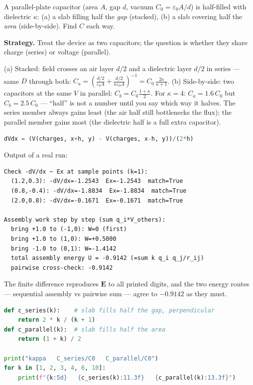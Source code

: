 \begin{example}\label{ex:halfdiel}
A parallel-plate capacitor (area $A$, gap $d$, vacuum $C_0=\varepsilon_0A/d$)
is half-filled with dielectric $\kappa$: (a) a slab filling half the
\emph{gap} (stacked), (b) a slab covering half the \emph{area}
(side-by-side). Find $C$ each way.
\par\smallskip
\textbf{Strategy.} Treat the device as two capacitors; the question is
whether they share charge (series) or voltage (parallel).
\begin{solution}
(a) Stacked: field crosses an air layer $d/2$ and a dielectric layer
$d/2$ in series --- same $D$ through both:
$C_a=\left(\frac{d/2}{\varepsilon_0A}+\frac{d/2}{\kappa\varepsilon_0A}\right)^{-1}
=C_0\,\frac{2\kappa}{\kappa+1}$.
(b) Side-by-side: two capacitors at the same $V$ in parallel:
$C_b=C_0\frac{1+\kappa}{2}$.
For $\kappa=4$: $C_a=1.6\,C_0$ but $C_b=2.5\,C_0$ --- ``half'' is
not a number until you say which way it halves. The series member
always gains least (the air half still bottlenecks the flux); the
parallel member gains most (the dielectric half is a full extra
capacitor). \checkmark
\end{solution}
\end{example}

\begin{lstlisting}[language=Python,caption={\texttt{code/ch11\_potential\_map.py} --- gradient check and assembly-energy audit.},label={lst:pot}]
dVdx = (V(charges, x+h, y) - V(charges, x-h, y))/(2*h)
\end{lstlisting}

Output of a real run:
\begin{lstlisting}[numbers=none]
Check -dV/dx ~ Ex at sample points (k=1):
  (1.2,0.3): -dV/dx=-1.2543  Ex=-1.2543  match=True
  (0.8,-0.4): -dV/dx=-1.8834  Ex=-1.8834  match=True
  (2.0,0.8): -dV/dx=-0.1671  Ex=-0.1671  match=True

Assembly work step by step (sum q_i*V_others):
  bring +1.0 to (-1,0): W=0 (first)
  bring +1.0 to (1,0): W=+0.5000
  bring -1.0 to (0,1): W=-1.4142
  total assembly energy U = -0.9142 (=sum k q_i q_j/r_ij)
  pairwise cross-check: -0.9142
\end{lstlisting}

The finite difference reproduces $\mathbf E$ to all printed digits, and
the two energy routes --- sequential assembly vs pairwise sum --- agree
to $-0.9142$ as they must.

\begin{lstlisting}[language=Python,caption={\texttt{code/ch11\_dielectric\_scan.py} --- half-dielectric both ways: how the gap is filled decides.},label={lst:dielscan}]
def c_series(k):    # slab fills half the gap, perpendicular
    return 2 * k / (k + 1)
def c_parallel(k):  # slab fills half the area
    return (1 + k) / 2

print("kappa   C_series/C0   C_parallel/C0")
for k in [1, 2, 3, 4, 6, 10]:
    print(f"{k:5d}   {c_series(k):11.3f}   {c_parallel(k):13.3f}")
\end{lstlisting}

